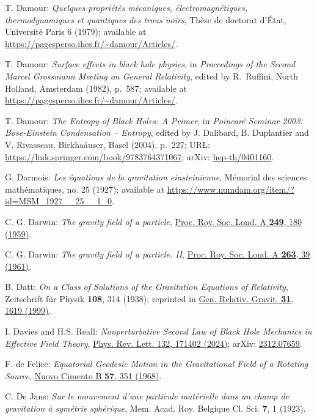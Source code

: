 \begin{thebibliography}{123}
T. Damour: {\em Quelques propri\'et\'es m\'ecaniques, \'electromagn\'etiques,
thermo\-dy\-na\-mi\-ques et quantiques des trous noirs},
Th\`ese de doctorat d'\'Etat, Universit\'e Paris 6 (1979); available at
\url{https://pagesperso.ihes.fr/~damour/Articles/}.

T. Damour: {\em Surface effects in black hole physics},
in {\em Proceedings of the Second Marcel Grossmann Meeting on General
Relativity},
edited by R.~Ruffini, North Holland, Amsterdam (1982), p.~587; available at
\url{https://pagesperso.ihes.fr/~damour/Articles/}.

T. Damour: {\em The Entropy of Black Holes: A Primer},
in {\em Poincaré Seminar 2003: Bose-Einstein Condensation -- Entropy},
edited by J. Dalibard, B. Duplantier and V. Rivasseau, Birkha\"auser, Basel (2004),
p.~227;
URL: \url{https://link.springer.com/book/9783764371067};
arXiv: \href{https://arxiv.org/abs/hep-th/0401160}{hep-th/0401160}.

G. Darmois:
{\em Les équations de la gravitation einsteinienne},
Mémorial des sciences mathématiques, no. 25 (1927); available at
\url{https://www.numdam.org/item/?id=MSM_1927__25__1_0}.

C. G. Darwin: {\em The gravity field of a particle},
\href{https://doi.org/10.1098/rspa.1959.0015}{Proc. Roy. Soc. Lond. A {\bf 249}, 180 (1959)}.

C. G. Darwin: {\em The gravity field of a particle. II},
\href{https://doi.org/10.1098/rspa.1961.0142}{Proc. Roy. Soc. Lond. A {\bf 263}, 39 (1961)}.

B. Datt:
{\em On a Class of Solutions of the Gravitation Equations of Relativity},
Zeitschrift für Physik {\bf 108}, 314 (1938);
reprinted in
\href{https://doi.org/10.1023/A:1026742707143}{Gen. Relativ. Gravit. {\bf 31}, 1619 (1999)}.

I. Davies and H.S. Reall:
{\em Nonperturbative Second Law of Black Hole Mechanics in Effective Field Theory},
\href{https://doi.org/10.1103/PhysRevLett.132.171402}{Phys. Rev. Lett. 132, 171402 (2024)};
arXiv: \href{https://arxiv.org/abs/2312.07659}{2312.07659}.

F. de Felice:
{\em Equatorial Geodesic Motion in the Gravitational Field of a Rotating Source},
\href{https://doi.org/10.1007/BF02710207}{Nuovo Cimento B {\bf 57}, 351 (1968)}.

C. De Jans:
\emph{Sur le mouvement d'une particule matérielle dans un champ de gravitation à symétrie sphérique},
Mem. Acad. Roy. Belgique Cl. Sci. {\bf 7}, 1 (1923).


\end{thebibliography}
